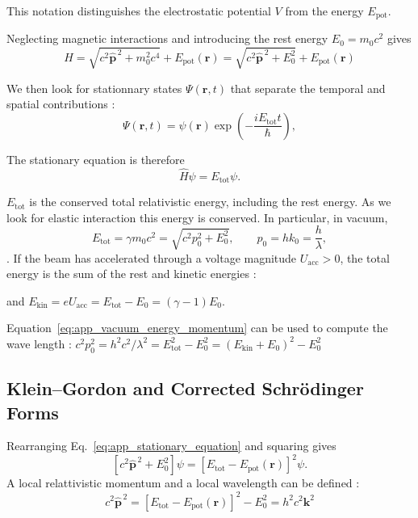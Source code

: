 This notation distinguishes the electrostatic potential $V$ from the energy
$E_{\mathrm{pot}}$.

Neglecting magnetic interactions and introducing the rest energy $ E_0 = m_0 c^2$ gives
\begin{equation}
\hat H
=
\sqrt{c^2\hat{\mathbf p}^{\,2}+m_0^2c^4}
+
E_{\mathrm{pot}}(\mathbf r) = \sqrt{c^2\hat{\mathbf p}^{\,2}+E_0^2}
+
E_{\mathrm{pot}}(\mathbf r)
\label{eq:app_relativistic_hamiltonian}
\end{equation}

We then look for stationnary states $\Psi(\mathbf r,t)$ that separate the temporal and spatial contributions : 
\begin{equation}
\Psi(\mathbf r,t)
=
\psi(\mathbf r)
\exp\left(-\frac{iE_{\mathrm{tot}}t}{\hbar}\right),
\label{eq:app_stationary_ansatz}
\end{equation}

 The stationary equation is therefore
\begin{equation}
\hat H\psi=E_{\mathrm{tot}}\psi.
\label{eq:app_stationary_equation}
\end{equation}

$E_{\mathrm{tot}}$ is the conserved total relativistic energy, including
the rest energy. As we look for elastic interaction this energy is conserved. In particular, 
in vacuum,
\begin{equation}
E_{\mathrm{tot}}
=
\gamma m_0c^2
=
\sqrt{c^2p_0^2+E_0^2},
\qquad
p_0=hk_0=\frac{h}{\lambda},
\label{eq:app_vacuum_energy_momentum}
\end{equation}. 
If the beam has accelerated through a voltage magnitude $U_{\mathrm{acc}}>0$, the total energy is the sum of the rest and kinetic energies : 

and $E_{\mathrm{kin}}=eU_{\mathrm{acc}}=E_{\mathrm{tot}}-E_0 = (\gamma - 1) E_0$. 

Equation~\eqref{eq:app_vacuum_energy_momentum} can be used to compute the wave length : 
$c^2 p_0^2 = h^2 c^2/\lambda^2 = E_{\mathrm{tot}}^2 - E_0^2 = (E_{\mathrm{kin}}+E_0)^2 - E_0^2$ 


\subsection{Klein--Gordon and Corrected Schr\"odinger Forms}

Rearranging Eq.~\eqref{eq:app_stationary_equation} and squaring gives
\begin{equation}
\left[c^2\hat{\mathbf p}^{\,2}+E_0^2\right]\psi
=
\left[E_{\mathrm{tot}}-E_{\mathrm{pot}}(\mathbf r)\right]^2\psi .
\label{eq:app_kg_before_linearisation}
\end{equation}
A local relattivistic momentum and a local wavelength can be defined : 
\begin{equation}
c^2\hat{\mathbf p}^{\,2}
=
\left[E_{\mathrm{tot}}-E_{\mathrm{pot}}(\mathbf r)\right]^2 - E_0^2 = h^2 c^2 \mathbf k^2
\label{eq:app_kg_before_linearisation2}
\end{equation}

